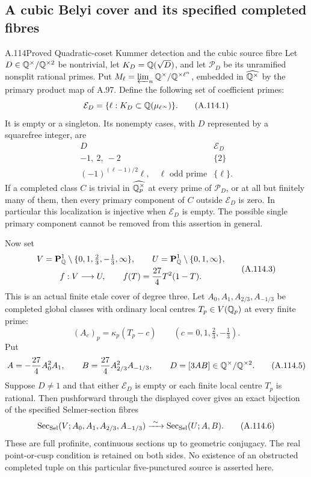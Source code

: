 \subsection{A cubic Belyi cover and its specified completed fibres}

\begin{statement}{A.114}{Proved}
{Quadratic-coset Kummer detection and the cubic source fibre}
Let $D\in\mathbb Q^\times/\mathbb Q^{\times2}$ be nontrivial, let
$K_D=\mathbb Q(\sqrt D)$, and let $\mathcal P_D$ be its
unramified nonsplit rational primes.
Put $M_\ell=\varprojlim_n\mathbb Q^\times/\mathbb Q^{\times\ell^n}$,
embedded in $\widehat{\mathbb Q^\times}$ by the primary
product map of A.97.
Define the following set of coefficient primes:
\[
 \mathcal E_D=\{\ell:K_D\subset\mathbb Q(\mu_{\ell^\infty})\}.
\tag{A.114.1}
\]
It is empty or a singleton.  Its nonempty cases,
with $D$ represented by a squarefree integer, are
\[
 \begin{array}{c|c}
  D&\mathcal E_D\\ \hline
  -1,\ 2,\ -2&\{2\}\\
  (-1)^{(\ell-1)/2}\ell,\quad\ell\text{ odd prime}&\{\ell\}.
 \end{array}
\tag{A.114.2}
\]
If a completed class $C$ is trivial in
$\widehat{\mathbb Q_p^\times}$ at every prime of
$\mathcal P_D$, or at all but finitely many of them,
then every primary component of $C$ outside
$\mathcal E_D$ is zero.
In particular this localization is injective
when $\mathcal E_D$ is empty.
The possible single primary component cannot
be removed from this assertion in general.

Now set
\[
 \begin{gathered}
 V=\mathbf P^1_\mathbb Q\setminus
           \{0,1,\tfrac23,-\tfrac13,\infty\},\qquad
 U=\mathbf P^1_\mathbb Q\setminus\{0,1,\infty\},\\
 f:V\longrightarrow U,\qquad
                 f(T)=\frac{27}{4}T^2(1-T).
 \end{gathered}
\tag{A.114.3}
\]
This is an actual finite etale cover of degree three.
Let $A_0,A_1,A_{2/3},A_{-1/3}$ be completed global
classes with ordinary local centres $T_p\in V(\mathbb Q_p)$
at every finite prime:
\[
          (A_c)_p=\kappa_p(T_p-c)
               \qquad(c=0,1,\tfrac23,-\tfrac13).
\tag{A.114.4}
\]
Put
\[
 A=-\frac{27}{4}A_0^2 A_1,\qquad
 B=\frac{27}{4}A_{2/3}^2 A_{-1/3},\qquad
                       D=[3AB]\in\mathbb Q^\times/\mathbb Q^{\times2}.
\tag{A.114.5}
\]
Suppose $D\ne1$ and that either $\mathcal E_D$ is
empty or each finite local centre $T_p$ is rational.
Then pushforward through the displayed cover gives
an exact bijection of the specified Selmer-section fibres
\[
 \operatorname{Sec}_{\rm Sel}
       (V;A_0,A_1,A_{2/3},A_{-1/3})
       \xrightarrow{\ \sim\ }
 \operatorname{Sec}_{\rm Sel}(U;A,B).
\tag{A.114.6}
\]
These are full profinite, continuous sections up to
geometric conjugacy.  The real point-or-cusp condition
is retained on both sides.  No existence of an
obstructed completed tuple on this particular
five-punctured source is asserted here.
\end{statement}
